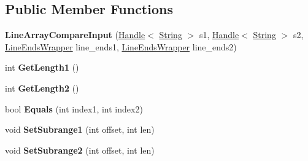 \subsection*{Public Member Functions}
\begin{DoxyCompactItemize}
\item 
{\bfseries Line\+Array\+Compare\+Input} (\hyperlink{classv8_1_1internal_1_1_handle}{Handle}$<$ \hyperlink{classv8_1_1internal_1_1_string}{String} $>$ s1, \hyperlink{classv8_1_1internal_1_1_handle}{Handle}$<$ \hyperlink{classv8_1_1internal_1_1_string}{String} $>$ s2, \hyperlink{classv8_1_1internal_1_1_line_ends_wrapper}{Line\+Ends\+Wrapper} line\+\_\+ends1, \hyperlink{classv8_1_1internal_1_1_line_ends_wrapper}{Line\+Ends\+Wrapper} line\+\_\+ends2)\hypertarget{classv8_1_1internal_1_1_line_array_compare_input_a81e0a329fa03d7221f1d62032b72c8b2}{}\label{classv8_1_1internal_1_1_line_array_compare_input_a81e0a329fa03d7221f1d62032b72c8b2}

\item 
int {\bfseries Get\+Length1} ()\hypertarget{classv8_1_1internal_1_1_line_array_compare_input_a34899c15164a56952bc71f6c2a70c977}{}\label{classv8_1_1internal_1_1_line_array_compare_input_a34899c15164a56952bc71f6c2a70c977}

\item 
int {\bfseries Get\+Length2} ()\hypertarget{classv8_1_1internal_1_1_line_array_compare_input_acd0d510eb2b4ef21069996e8659b5b38}{}\label{classv8_1_1internal_1_1_line_array_compare_input_acd0d510eb2b4ef21069996e8659b5b38}

\item 
bool {\bfseries Equals} (int index1, int index2)\hypertarget{classv8_1_1internal_1_1_line_array_compare_input_a15487bb63d0cd600659652742a62c6fc}{}\label{classv8_1_1internal_1_1_line_array_compare_input_a15487bb63d0cd600659652742a62c6fc}

\item 
void {\bfseries Set\+Subrange1} (int offset, int len)\hypertarget{classv8_1_1internal_1_1_line_array_compare_input_ad439fe77f7496b6841215f86dbae6fa0}{}\label{classv8_1_1internal_1_1_line_array_compare_input_ad439fe77f7496b6841215f86dbae6fa0}

\item 
void {\bfseries Set\+Subrange2} (int offset, int len)\hypertarget{classv8_1_1internal_1_1_line_array_compare_input_ae1d51f90c06cdf61db6daf4db509e178}{}\label{classv8_1_1internal_1_1_line_array_compare_input_ae1d51f90c06cdf61db6daf4db509e178}

\end{DoxyCompactItemize}

